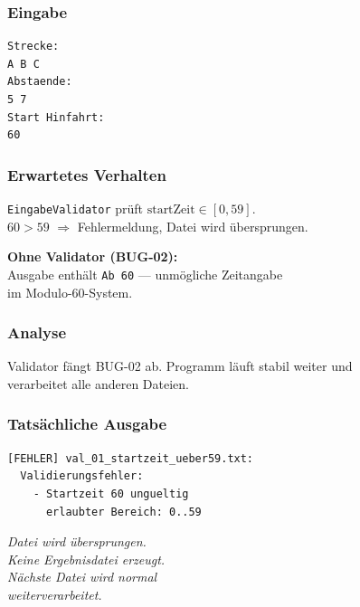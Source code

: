 \documentclass[12pt,a4paper]{article}
\begin{document}
\noindent
\begin{minipage}[t]{0.48\textwidth}
\scriptsize
\setlength{\tabcolsep}{2pt}

\subsubsection*{Eingabe}
\begin{lstlisting}
Strecke:
A B C
Abstaende:
5 7
Start Hinfahrt:
60
\end{lstlisting}

\subsubsection*{Erwartetes Verhalten}
\texttt{EingabeValidator} prüft $\text{startZeit} \in [0,59]$.\\
$60 > 59$ $\Rightarrow$ Fehlermeldung, Datei wird übersprungen.

\vspace{4pt}
\textbf{Ohne Validator (BUG-02):}\\
Ausgabe enthält \texttt{Ab 60} — unmögliche Zeitangabe\\
im Modulo-60-System.

\subsubsection*{Analyse}
Validator fängt BUG-02 ab.
Programm läuft stabil weiter und\\
verarbeitet alle anderen Dateien.
\end{minipage}
\hfill
\begin{minipage}[t]{0.48\textwidth}
\scriptsize
\subsubsection*{Tatsächliche Ausgabe}
\begin{lstlisting}
[FEHLER] val_01_startzeit_ueber59.txt:
  Validierungsfehler:
    - Startzeit 60 ungueltig
      erlaubter Bereich: 0..59
\end{lstlisting}

\vspace{6pt}
\textit{Datei wird übersprungen.\\
Keine Ergebnisdatei erzeugt.\\
Nächste Datei wird normal\\
weiterverarbeitet.}
\end{minipage}

\end{document}
